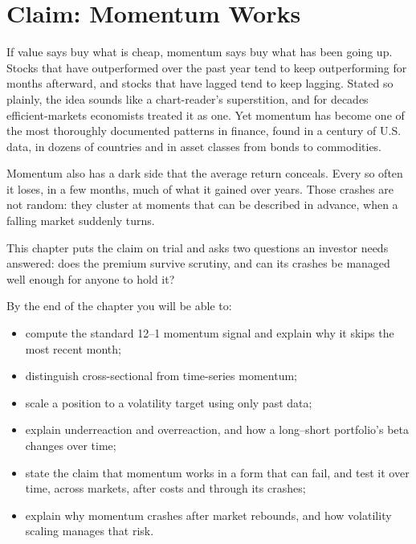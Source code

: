 \makeatletter
{}
\makeatother

\chapter{Claim: Momentum Works}
\label{ch:09}

If value says buy what is cheap, momentum says buy what has been going up. Stocks that have outperformed over the past year tend to keep outperforming for months afterward, and stocks that have lagged tend to keep lagging. Stated so plainly, the idea sounds like a chart-reader's superstition, and for decades efficient-markets economists treated it as one. Yet momentum has become one of the most thoroughly documented patterns in finance, found in a century of U.S. data, in dozens of countries and in asset classes from bonds to commodities.

Momentum also has a dark side that the average return conceals. Every so often it loses, in a few months, much of what it gained over years. Those crashes are not random: they cluster at moments that can be described in advance, when a falling market suddenly turns.

This chapter puts the claim on trial and asks two questions an investor needs answered: does the premium survive scrutiny, and can its crashes be managed well enough for anyone to hold it?

By the end of the chapter you will be able to:

\begin{itemize}
  \item compute the standard 12--1 momentum signal and explain why it skips the most recent month;
  \item distinguish cross-sectional from time-series momentum;
  \item scale a position to a volatility target using only past data;
  \item explain underreaction and overreaction, and how a long--short portfolio's beta changes over time;
  \item state the claim that momentum works in a form that can fail, and test it over time, across markets, after costs and through its crashes;
  \item explain why momentum crashes after market rebounds, and how volatility scaling manages that risk.
\end{itemize}

